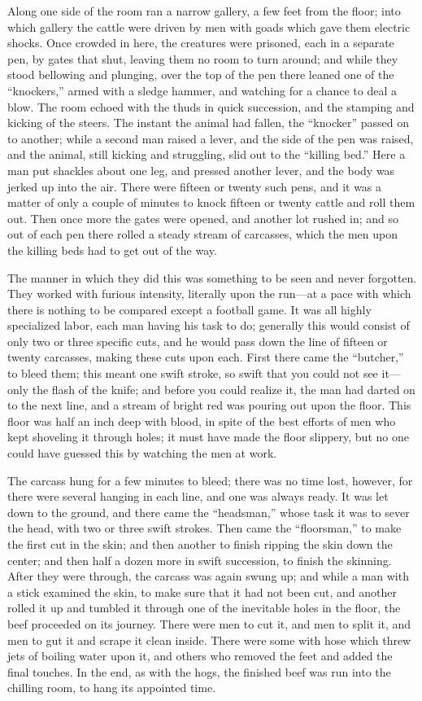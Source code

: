 \documentclass[
]{article}
\begin{document}
Along one side of the room ran a narrow gallery, a few feet from the floor; into which gallery the cattle were driven by men with goads which gave them electric shocks. Once crowded in here, the creatures were prisoned, each in a separate pen, by gates that shut, leaving them no room to turn around; and while they stood bellowing and plunging, over the top of the pen there leaned one of the ``knockers,'' armed with a sledge hammer, and watching for a chance to deal a blow. The room echoed with the thuds in quick succession, and the stamping and kicking of the steers. The instant the animal had fallen, the ``knocker'' passed on to another; while a second man raised a lever, and the side of the pen was raised, and the animal, still kicking and struggling, slid out to the ``killing bed.'' Here a man put shackles about one leg, and pressed another lever, and the body was jerked up into the air. There were fifteen or twenty such pens, and it was a matter of only a couple of minutes to knock fifteen or twenty cattle and roll them out. Then once more the gates were opened, and another lot rushed in; and so out of each pen there rolled a steady stream of carcasses, which the men upon the killing beds had to get out of the way.

The manner in which they did this was something to be seen and never forgotten. They worked with furious intensity, literally upon the run---at a pace with which there is nothing to be compared except a football game. It was all highly specialized labor, each man having his task to do; generally this would consist of only two or three specific cuts, and he would pass down the line of fifteen or twenty carcasses, making these cuts upon each. First there came the ``butcher,'' to bleed them; this meant one swift stroke, so swift that you could not see it---only the flash of the knife; and before you could realize it, the man had darted on to the next line, and a stream of bright red was pouring out upon the floor. This floor was half an inch deep with blood, in spite of the best efforts of men who kept shoveling it through holes; it must have made the floor slippery, but no one could have guessed this by watching the men at work.

The carcass hung for a few minutes to bleed; there was no time lost, however, for there were several hanging in each line, and one was always ready. It was let down to the ground, and there came the ``headsman,'' whose task it was to sever the head, with two or three swift strokes. Then came the ``floorsman,'' to make the first cut in the skin; and then another to finish ripping the skin down the center; and then half a dozen more in swift succession, to finish the skinning. After they were through, the carcass was again swung up; and while a man with a stick examined the skin, to make sure that it had not been cut, and another rolled it up and tumbled it through one of the inevitable holes in the floor, the beef proceeded on its journey. There were men to cut it, and men to split it, and men to gut it and scrape it clean inside. There were some with hose which threw jets of boiling water upon it, and others who removed the feet and added the final touches. In the end, as with the hogs, the finished beef was run into the chilling room, to hang its appointed time.
\end{document}
